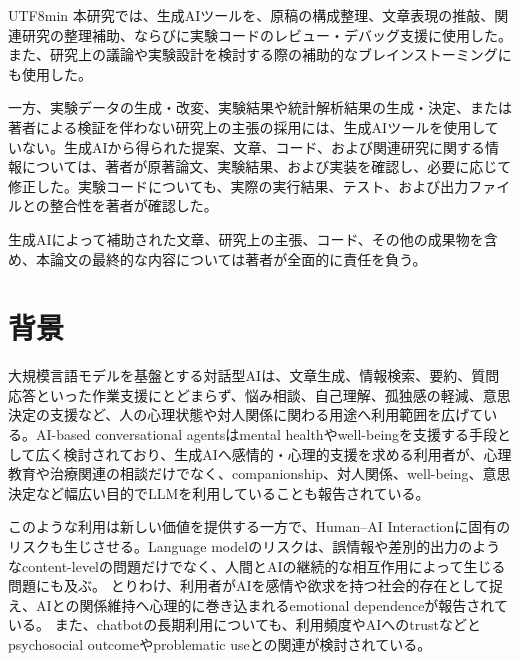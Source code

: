 \documentclass{article} %
\begin{document}
\begin{CJK*}{UTF8}{min}
本研究では、生成AIツールを、原稿の構成整理、文章表現の推敲、関連研究の整理補助、ならびに実験コードのレビュー・デバッグ支援に使用した。また、研究上の議論や実験設計を検討する際の補助的なブレインストーミングにも使用した。

一方、実験データの生成・改変、実験結果や統計解析結果の生成・決定、または著者による検証を伴わない研究上の主張の採用には、生成AIツールを使用していない。生成AIから得られた提案、文章、コード、および関連研究に関する情報については、著者が原著論文、実験結果、および実装を確認し、必要に応じて修正した。実験コードについても、実際の実行結果、テスト、および出力ファイルとの整合性を著者が確認した。

生成AIによって補助された文章、研究上の主張、コード、その他の成果物を含め、本論文の最終的な内容については著者が全面的に責任を負う。




\appendix

\section{背景}
\label{app:background}

大規模言語モデルを基盤とする対話型AIは、文章生成、情報検索、要約、質問応答といった作業支援にとどまらず、悩み相談、自己理解、孤独感の軽減、意思決定の支援など、人の心理状態や対人関係に関わる用途へ利用範囲を広げている。AI-based conversational agentsはmental healthやwell-beingを支援する手段として広く検討されており\citep{li2023systematic}、生成AIへ感情的・心理的支援を求める利用者が、心理教育や治療関連の相談だけでなく、companionship、対人関係、well-being、意思決定など幅広い目的でLLMを利用していることも報告されている\citep{luo2025seeking}。

このような利用は新しい価値を提供する一方で、Human--AI Interactionに固有のリスクも生じさせる。Language modelのリスクは、誤情報や差別的出力のようなcontent-levelの問題だけでなく、人間とAIの継続的な相互作用によって生じる問題にも及ぶ\citep{weidinger2022taxonomy}。
とりわけ、利用者がAIを感情や欲求を持つ社会的存在として捉え、AIとの関係維持へ心理的に巻き込まれるemotional dependenceが報告されている\citep{laestadius2024too}。
また、chatbotの長期利用についても、利用頻度やAIへのtrustなどとpsychosocial outcomeやproblematic useとの関連が検討されている\citep{fang2025ai}。


\end{CJK*}
\end{document}
